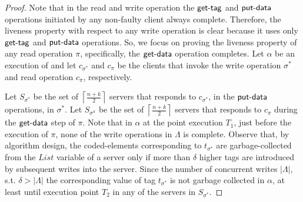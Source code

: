 				\begin{proof}
				Note that in the read and write operation the  $\act{get-tag}$ and $\act{put-data}$ operations initiated by any non-faulty client  always complete.
				Therefore, the liveness property with respect to any write operation is clear because it uses only  $\act{get-tag}$ and $\act{put-data}$ operations. So, we focus on proving the liveness property of any read operation $\pi$, 
				specifically,   the  $\act{get-data}$ operation completes. Let $\alpha $ be an execution of \treasmod{} and let 
				$c_{\sigma^*}$ and $c_{\pi}$ be the clients that invoke the write operation $\sigma^*$ and 
				read operation $c_{\pi}$, respectively.
				
				Let $S_{\sigma^{*}}$ be the set of 
				$\left\lceil \frac{n+k}{2} \right \rceil$ servers that responds to 
				$c_{\sigma^*}$, in the $\act{put-data}$ operations, in $\sigma^*$.
				 Let $S_{\sigma^{\pi}}$ be the set of $\left\lceil \frac{n+k}{2} \right \rceil$ servers that responds to  $c_{\pi}$ during the  $\act{get-data}$ step of $\pi$. Note that in $\alpha$ at the point execution $T_1$, just before the execution of  $\pi$, none of the write operations in 
				 $\Lambda$ is complete. Observe that,  by algorithm design, the coded-elements corresponding to  $t_{\sigma^*}$ are garbage-collected from the $List$ variable of a server only if more than $\delta$ higher tags are introduced by subsequent writes into the server.  Since the number of concurrent writes  $|\Lambda|$, s.t.  $\delta > | \Lambda |$ the corresponding value of tag $t_{\sigma^*}$ is not garbage collected in $\alpha$, at least until execution point $T_2$  in  any of the servers in $S_{\sigma^*}$.
				 

\end{proof}
